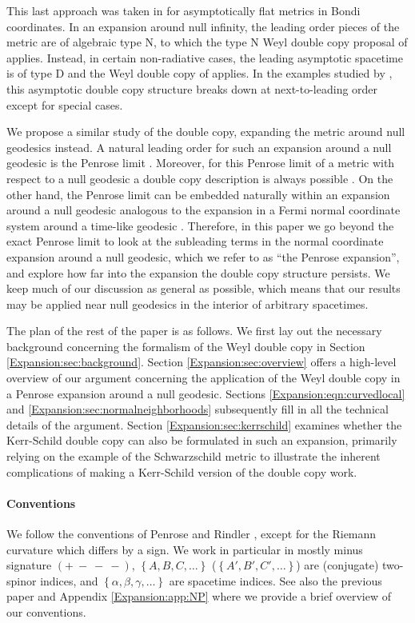 This last approach was taken in \cite{Godazgar:2021iae} for asymptotically flat metrics in Bondi coordinates. In an expansion around null infinity, the
leading order pieces of the metric are of algebraic type N, to which the type N Weyl double
copy proposal of \cite{Godazgar:2020zbv} applies. Instead, in certain non-radiative cases, the leading asymptotic spacetime is of type D and the Weyl double copy of \cite{Luna:2018dpt} applies. In the examples studied by \cite{Godazgar:2021iae}, this asymptotic double copy structure breaks down at next-to-leading order except for special cases.

We propose a similar study of the double copy, expanding the metric around
null geodesics instead. A natural leading order for such an expansion around a null geodesic is the Penrose limit  \cite{penrose1976any}. Moreover, for this Penrose limit of a metric with respect to a  null geodesic a double copy description is always possible \cite{Chawla:2024mse}. On the other hand, the Penrose limit can be embedded naturally within an expansion around a null geodesic analogous to the expansion in a Fermi normal coordinate system around a time-like geodesic \cite{Blau:2006ar}. Therefore, in this paper we go beyond the exact Penrose limit to look at the subleading terms in the normal coordinate expansion around a null geodesic, which we refer to as ``the Penrose expansion'', and explore how far into the
expansion the double copy structure persists. We keep much of our discussion as general as possible, which means
that our results may be applied near null geodesics in the interior of arbitrary spacetimes.

The plan of the rest of the paper is as follows. We first lay out the necessary background concerning the formalism
of the Weyl double copy in Section \ref{Expansion:sec:background}. Section \ref{Expansion:sec:overview} offers a high-level overview of our argument concerning the application of the Weyl double copy in a Penrose expansion around a null geodesic. Sections \ref{Expansion:eqn:curvedlocal} and \ref{Expansion:sec:normalneighborhoods} subsequently fill in all the technical details of the argument. Section
\ref{Expansion:sec:kerrschild} examines whether the Kerr-Schild double copy can also be formulated in such an expansion,
primarily relying on the example of the Schwarzschild metric to illustrate the inherent complications of making a
Kerr-Schild version of the double copy work.

\paragraph*{Conventions} We follow the conventions of Penrose and Rindler \cite{Penrose:1985bww}, except for the Riemann curvature which differs by a sign. We work in particular in mostly minus signature $(+\ -\ -\ -)$, $\left\lbrace A, B, C, \ldots \right\rbrace$ ($\left\lbrace A', B', C', \ldots \right\rbrace$) are (conjugate) two-spinor indices, and $\left\lbrace \alpha, \beta, \gamma, \ldots \right\rbrace$ are spacetime indices. See also the
previous paper \cite{Chawla:2024mse} and Appendix \ref{Expansion:app:NP} where we provide a brief overview of our conventions.

